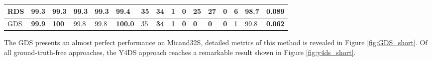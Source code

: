 \begin{table}[]
{\begin{tabular}{|l|l|l|l|l|l|l|l|l|l|l|l|l|l|l|l|}
			RDS    & 99.3                                                 & 99.3                                                & 99.3                                                & 99.3                                                   & 99.4                                                   & 35                                                   & \textbf{34} & \textbf{1}                                           & \textbf{0} & 25         & 27         & \textbf{0} & 6          & 98.7                                                 & 0.089          \\ \hline
			GDS    & \textbf{99.9}                                        & \textbf{100}                                        & 99.8                                                & 99.8                                                   & \textbf{100.0}                                         & 35                                                   & \textbf{34} & \textbf{1}                                           & \textbf{0} & \textbf{0} & \textbf{0} & \textbf{0} & 1          & 99.8                                                 & \textbf{0.062} \\ \hline
		\end{tabular}%
	}
\end{table}
The GDS presents an almost perfect performance on Micand32S, detailed metrics of this method is revealed in Figure \ref{fig:GDS_short}. Of all ground-truth-free approaches, the Y4DS approach reaches a remarkable result shown in Figure \ref{fig:y4ds_short}.
